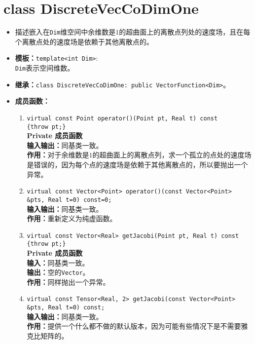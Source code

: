 \documentclass[a4paper,twoside]{ctexart}
\begin{document}
\section{class DiscreteVecCoDimOne}
\begin{itemize}
    \item 描述嵌入在\texttt{Dim}维空间中余维数是$1$的超曲面上的离散点列处的速度场，且在每个离散点处的速度场是依赖于其他离散点的。
    \item \textbf{模板：}\texttt{template<int Dim>}:\\
    \texttt{Dim}表示空间维数。
    \item \textbf{继承：}\texttt{class DiscreteVecCoDimOne: public VectorFunction<Dim>}。
    \item \textbf{成员函数：}
            \begin{enumerate}[(1)]
                \item \texttt{virtual const Point operator()(Point pt, Real t) const\\
                \{throw pt;\}}\\
                \textbf{Private 成员函数}\\
                \textbf{输入输出：}同基类一致。\\
                \textbf{作用：}对于余维数是$1$的超曲面上的离散点列，求一个孤立的点处的速度场是错误的，因为每个点的速度场是依赖于其他离散点的，所以要抛出一个异常。
                \item \texttt{virtual const Vector<Point> operator()(const Vector<Point> \&pts, Real t=0) const=0;}\\
                \textbf{输入输出：}同基类一致。\\
                \textbf{作用：}重新定义为纯虚函数。
                \item \texttt{virtual const Vector<Real> getJacobi(Point pt, Real t) const\\
                \{throw pt;\}}\\
                \textbf{Private 成员函数}\\
                \textbf{输入：}同基类一致。\\
                \textbf{输出：}空的\texttt{Vector}。\\
                \textbf{作用：}同样抛出一个异常。
                \item \texttt{virtual const Tensor<Real, 2> getJacobi(const Vector<Point> \&pts, Real t=0) const;}\\
                \textbf{输入输出：}同基类一致。\\
                \textbf{作用：}提供一个什么都不做的默认版本，因为可能有些情况下是不需要雅克比矩阵的。
            \end{enumerate}
\end{itemize}
\end{document}

